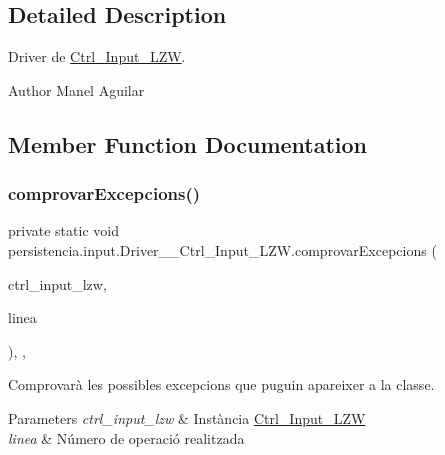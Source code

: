 \subsection{Detailed Description}
Driver de \hyperlink{classpersistencia_1_1input_1_1Ctrl__Input__LZW}{Ctrl\+\_\+\+Input\+\_\+\+L\+ZW}. 

\begin{DoxyAuthor}{Author}
Manel Aguilar 
\end{DoxyAuthor}


\subsection{Member Function Documentation}
\mbox{\label{classpersistencia_1_1input_1_1Driver____Ctrl__Input__LZW_a86e186fca84cfae1f5a019b4853a0902}} 
\subsubsection{\texorpdfstring{comprovar\+Excepcions()}{comprovarExcepcions()}}
{\footnotesize\ttfamily private static void persistencia.\+input.\+Driver\+\_\+\+\_\+\+Ctrl\+\_\+\+Input\+\_\+\+L\+Z\+W.\+comprovar\+Excepcions (\begin{DoxyParamCaption}\item[{\hyperlink{classpersistencia_1_1input_1_1Ctrl__Input__LZW}{Ctrl\+\_\+\+Input\+\_\+\+L\+ZW}}]{ctrl\+\_\+input\+\_\+lzw,  }\item[{String}]{linea }\end{DoxyParamCaption})\hspace{0.3cm}{\ttfamily [inline]}, {\ttfamily [static]}, {\ttfamily [private]}}



Comprovarà les possibles excepcions que puguin apareixer a la classe. 


\begin{DoxyParams}{Parameters}
{\em ctrl\+\_\+input\+\_\+lzw} & Instància \hyperlink{classpersistencia_1_1input_1_1Ctrl__Input__LZW}{Ctrl\+\_\+\+Input\+\_\+\+L\+ZW} \\
\hline
{\em linea} & Número de operació realitzada \\
\hline
\end{DoxyParams}

